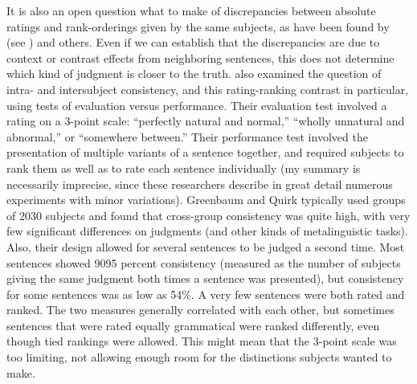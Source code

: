 It is also an open question what to make of discrepancies between absolute ratings and rank-orderings given by the same subjects, as have been found by \citet{SnowEtAl1977} (see )
and others. Even if we can establish that the discrepancies are due to context or contrast effects from neighboring sentences, this does not determine which kind of judgment is closer to the truth. \citet{GreenbaumEtAl1970} also examined the question of intra- and intersubject consistency, and this rating-ranking contrast in particular, using tests of evaluation versus performance. Their evaluation test involved a rating on a 3-point scale: ``perfectly natural and normal,'' ``wholly unnatural and abnormal,'' or ``somewhere between.'' Their performance test involved the presentation of multiple variants of a sentence together, and required subjects to rank them as well as to rate each sentence individually (my summary is necessarily imprecise, since these researchers describe in great detail numerous experiments with minor variations). Greenbaum and Quirk typically used groups of 20\textendash{}30 subjects and found that cross-group consistency was quite high, with very few significant differences on judgments (and other kinds of metalinguistic tasks). Also, their design allowed for several sentences to be judged a second time. Most sentences showed 90\textendash{}95 percent consistency (measured as the number of subjects giving the same judgment both times a sentence was presented), but consistency for some sentences
was as low as 54\%. A very few sentences were both rated and ranked. The two measures generally correlated with each other, but sometimes sentences that were rated equally grammatical were ranked differently, even  though  tied  rankings were allowed. This might mean that the 3-point scale was too limiting, not allowing enough room for the distinctions subjects wanted to make.

